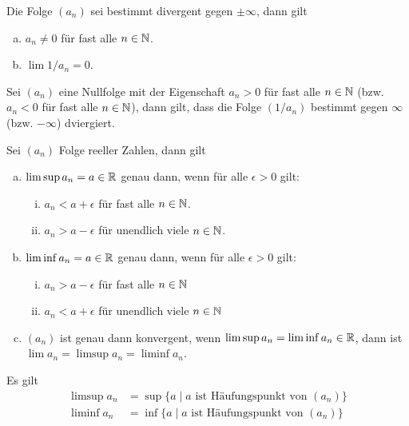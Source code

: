     \begin{satz}
        Die Folge $(a_n)$ sei bestimmt divergent gegen $\pm \infty$, dann gilt
        \begin{enumerate}[(a)]
            \item $a_n\neq 0$ für fast alle $n\in \mathbb{N}$.
            \item $\lim 1/a_n = 0$.
        \end{enumerate}
    \end{satz}
    \begin{satz}
        Sei $(a_n)$ eine Nullfolge mit der Eigenschaft $a_n>0$ für fast alle $n\in \mathbb{N}$ (bzw. $a_n<0$ für fast alle $n\in \mathbb{N}$), dann gilt, dass die Folge $(1/a_n)$ bestimmt gegen $\infty$ (bzw. $-\infty$) dviergiert.
    \end{satz}
    \begin{satz}
        Sei $(a_n)$ Folge reeller Zahlen, dann gilt 
        \begin{enumerate}[(a)]
            \item $\limsup a_n = a\in \mathbb{R}$ genau dann, wenn für alle $\epsilon>0$ gilt:
            \begin{enumerate}[(i)]
                \item $a_n < a+\epsilon$ für fast alle $n\in \mathbb{N}$.
                \item $a_n > a-\epsilon$ für unendlich viele $n\in \mathbb{N}$.
            \end{enumerate}
            \item $\liminf a_n = a\in \mathbb{R}$ genau dann, wenn für alle $\epsilon>0$ gilt:
            \begin{enumerate}[(i)]
                \item $a_n > a-\epsilon$ für fast alle $n\in \mathbb{N}$
                \item $a_n < a+\epsilon$ für unendlich viele $n\in \mathbb{N}$
            \end{enumerate}
            \item $(a_n)$ ist genau dann konvergent, wenn $\limsup a_n = \liminf a_n \in \mathbb{R}$, dann ist $\lim a_n = \limsup a_n = \liminf a_n$.
        \end{enumerate}
    \end{satz}
    \begin{kor}
        Es gilt 
        \begin{align*}
            \limsup a_n &= \sup \{a\mid a \text{ ist Häufungspunkt von } (a_n) \} \\
            \liminf a_n &= \inf \{a\mid a \text{ ist Häufungspunkt von } (a_n) \} 
        \end{align*}
    \end{kor}